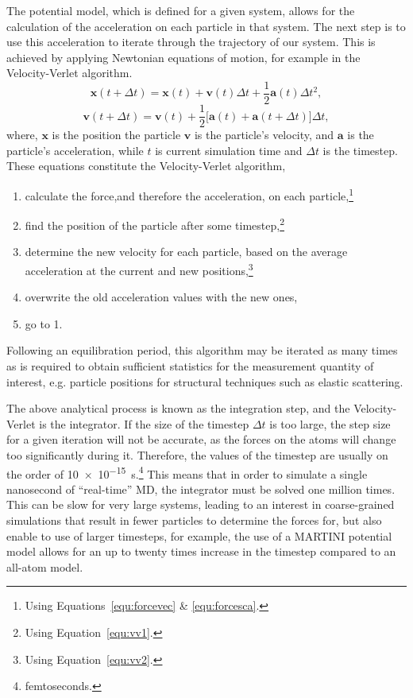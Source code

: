 The potential model, which is defined for a given system, allows for the calculation of the acceleration on each particle in that system.
The next step is to use this acceleration to iterate through the trajectory of our system.
This is achieved by applying Newtonian equations of motion, for example in the Velocity-Verlet algorithm.\autocite{swope_computer_1982}
%
\begin{equation}
\mathbf{x}(t + \Delta t) = \mathbf{x}(t) + \mathbf{v}(t)\Delta t + \frac{1}{2}\mathbf{a}(t)\Delta t^2,
\label{equ:vv1}
\end{equation}
\begin{equation}
\mathbf{v}(t + \Delta t) = \mathbf{v}(t) + \frac{1}{2}\big[\mathbf{a}(t) + \mathbf{a}(t+\Delta t)\big]\Delta t,
\label{equ:vv2}
\end{equation}
%
where, $\mathbf{x}$ is the position the particle $\mathbf{v}$ is the particle's velocity, and $\mathbf{a}$ is the particle's acceleration, while $t$ is current simulation time and $\Delta t$ is the timestep.
These equations constitute the Velocity-Verlet algorithm,
%
\begin{enumerate}
\item calculate the force,and therefore the acceleration, on each particle,\footnote{Using Equations~\protect\ref{equ:forcevec} \& \protect\ref{equ:forcesca}.}
\item find the position of the particle after some timestep,\footnote{Using Equation~\protect\ref{equ:vv1}.}
\item determine the new velocity for each particle, based on the average acceleration at the current and new positions,\footnote{Using Equation~\protect\ref{equ:vv2}.}
\item overwrite the old acceleration values with the new ones,
\item go to 1.
\end{enumerate}
%
Following an equilibration period, this algorithm may be iterated as many times as is required to obtain sufficient statistics for the measurement quantity of interest, e.g. particle positions for structural techniques such as elastic scattering.

The above analytical process is known as the integration step, and the Velocity-Verlet is the integrator.
If the size of the timestep $\Delta t$ is too large, the step size for a given iteration will not be accurate, as the forces on the atoms will change too significantly during it.
Therefore, the values of the timestep are usually on the order of \SI{10e-15}{\second}.\footnote{femtoseconds.}
This means that in order to simulate a single nanosecond of ``real-time'' MD, the integrator must be solved one million times.
This can be slow for very large systems, leading to an interest in coarse-grained simulations that result in fewer particles to determine the forces for, but also enable to use of larger timesteps,\autocite[so fewer, faster integration steps must be solved]{rudd_coarse-grained_1998,brini_systematic_2013} for example, the use of a MARTINI potential model allows for an up to twenty times increase in the timestep compared to an all-atom model.


